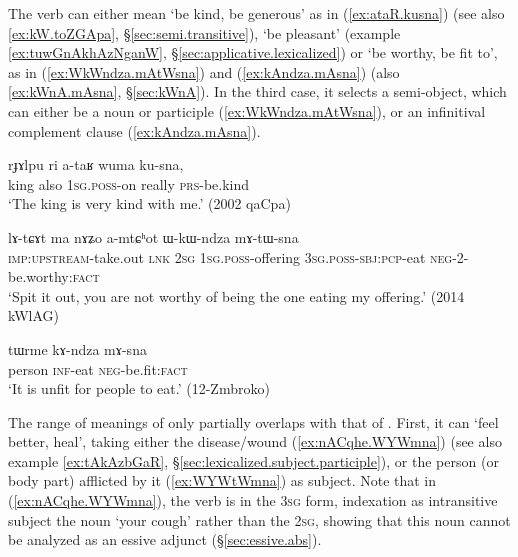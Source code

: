 The verb  can either mean `be kind, be generous' as in (\ref{ex:ataR.kusna}) (see also \ref{ex:kW.toZGApa}, §\ref{sec:semi.transitive}), `be pleasant' (example \ref{ex:tuwGnAkhAzNganW}, §\ref{sec:applicative.lexicalized}) or `be worthy, be fit to', as in (\ref{ex:WkWndza.mAtWsna}) and (\ref{ex:kAndza.mAsna}) (also \ref{ex:kWnA.mAsna}, §\ref{sec:kWnA}). In the third case, it selects a semi-object, which can either be a noun or participle (\ref{ex:WkWndza.mAtWsna}), or an infinitival complement clause (\ref{ex:kAndza.mAsna}).

\begin{exe}
\ex \label{ex:ataR.kusna}
\gll rɟɤlpu ri a-taʁ wuma ku-sna, \\
king also \textsc{1sg}.\textsc{poss}-on really \textsc{prs}-be.kind \\
\glt `The king is very kind with me.' (2002 qaCpa)
\end{exe}

\begin{exe}
\ex \label{ex:WkWndza.mAtWsna}
\gll lɤ-tɕɤt ma nɤʑo a-mtɕʰot ɯ-kɯ-ndza mɤ-tɯ-sna \\
\textsc{imp}:\textsc{upstream}-take.out \textsc{lnk} \textsc{2sg} \textsc{1sg}.\textsc{poss}-offering \textsc{3sg}.\textsc{poss}-\textsc{sbj}:\textsc{pcp}-eat \textsc{neg}-2-be.worthy:\textsc{fact} \\
\glt `Spit it out, you are not worthy of being the one eating my offering.' (2014 kWlAG)
\end{exe}

\begin{exe}
\ex \label{ex:kAndza.mAsna}
\gll tɯrme kɤ-ndza mɤ-sna\\
person \textsc{inf}-eat \textsc{neg}-be.fit:\textsc{fact} \\
\glt `It is unfit for people to eat.' (12-Zmbroko) 
\end{exe}

The range of meanings of  only partially overlaps with that of . First, it can `feel better, heal', taking either the disease/wound (\ref{ex:nACqhe.WYWmna}) (see also example \ref{ex:tAkAzbGaR}, §\ref{sec:lexicalized.subject.participle}), or the person (or body part) afflicted by it (\ref{ex:WYWtWmna}) as subject. Note that in (\ref{ex:nACqhe.WYWmna}), the verb is in the \textsc{3sg} form, indexation as intransitive subject the noun  `your cough' rather than the \textsc{2sg}, showing that this noun cannot be analyzed as an essive adjunct (§\ref{sec:essive.abs}).

